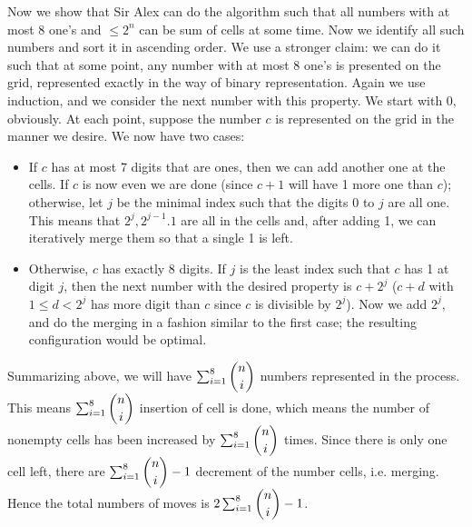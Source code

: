\documentclass[11pt,a4paper]{article}
\begin{document}
\begin{enumerate}
	Now we show that Sir Alex can do the algorithm such that all numbers with at most 8 one's and $\le 2^n$ can be sum of cells at some time. Now we identify all such numbers and sort it in ascending order. We use a stronger claim: we can do it such that at some point, any number with at most 8 one's is presented on the grid, represented exactly in the way of binary representation. Again we use induction, and we consider the next number with this property. We start with 0, obviously. At each point, suppose the number $c$ is represented on the grid in the manner we desire. We now have two cases: 
	\begin{itemize}
		\item If $c$ has at most 7 digits that are ones, then we can add another one at the cells. If $c$ is now even we are done (since $c+1$ will have 1 more one than $c$); otherwise, let $j$ be the minimal index such that the digits 0 to $j$ are all one. This means that $2^j, 2^{j - 1}. 1$ are all in the cells and, after adding 1, we can iteratively merge them so that a single 1 is left. 
		\item Otherwise, $c$ has exactly 8 digits. If $j$ is the least index such that $c$ has 1 at digit $j$, then the next number with the desired property is $c+2^{j}$ ($c+d$ with $1\le d<2^j$ has more digit than $c$ since $c$ is divisible by $2^j$). Now we add $2^j$, and do the merging in a fashion similar to the first case; the resulting configuration would be optimal. 
	\end{itemize}

Summarizing above, we will have $\sum_{i=1}^8\dbinom{n}{i}$ numbers represented in the process. This means $\sum_{i=1}^8\dbinom{n}{i}$ insertion of cell is done, which means the number of nonempty cells has been increased by $\sum_{i=1}^8\dbinom{n}{i}$ times. Since there is only one cell left, there are $\sum_{i=1}^8\dbinom{n}{i}-1$ decrement of the number cells, i.e. merging. Hence the total numbers of moves is $2\sum_{i=1}^8\dbinom{n}{i}-1$. 
\end{enumerate}
\end{document}
